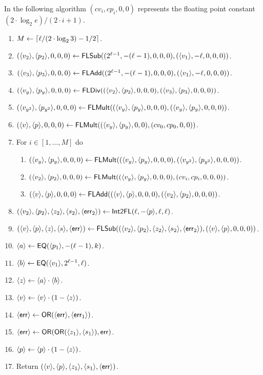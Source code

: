 In the following algorithm $(cv_i,cp_i,0,0)$ represents the floating point
constant $(2 \cdot \log_2 e)/(2 \cdot i+1)$.
\begin{enumerate}
\item $M \leftarrow {\lceil  \ell/(2 \cdot \log_2 3)-1/2 \rceil}$.
\item $(\langle v_2 \rangle,\langle p_2 \rangle,0,0,0) \leftarrow \mathsf{FLSub}((2^{\ell-1},-(\ell-1),0,0,0),(\langle v_1 \rangle,-\ell,0,0,0))$.
\item $(\langle v_3 \rangle,\langle p_3 \rangle,0,0,0) \leftarrow \mathsf{FLAdd}((2^{\ell-1},-(\ell-1),0,0,0),(\langle v_1 \rangle,-\ell,0,0,0))$.
\item $(\langle v_y \rangle,\langle p_y \rangle,0,0,0) \leftarrow \mathsf{FLDiv}((\langle v_2 \rangle,\langle p_2 \rangle,0,0,0),(\langle v_3 \rangle,\langle p_3 \rangle,0,0,0))$.
\item $(\langle v_{y^2} \rangle,\langle p_{y^2} \rangle,0,0,0) \leftarrow \mathsf{FLMult}((\langle v_y \rangle,\langle p_y \rangle,0,0,0),(\langle v_y \rangle,\langle p_y \rangle,0,0,0))$.
\item $(\langle v \rangle,\langle p \rangle,0,0,0) \leftarrow  \mathsf{FLMult}((\langle v_y \rangle,\langle p_y \rangle,0,0),(cv_0,cp_0,0,0))$.
\item For $i \in[1,\ldots,M]$ do
\begin{enumerate}
  \item $(\langle v_y \rangle,\langle p_y \rangle,0,0,0) \leftarrow \mathsf{FLMult}((\langle v_y \rangle,\langle p_y \rangle,0,0,0),(\langle v_{y^2} \rangle,\langle p_{y^2} \rangle,0,0,0))$.
  \item $(\langle v_2 \rangle,\langle p_2 \rangle,0,0,0) \leftarrow \mathsf{FLMult}((\langle v_y \rangle,\langle p_y \rangle,0,0,0),(cv_i,cp_i,0,0,0))$.
  \item $(\langle v \rangle,\langle p \rangle,0,0,0) \leftarrow \mathsf{FLAdd}((\langle v \rangle,\langle p \rangle,0,0,0),(\langle v_2 \rangle,\langle p_2 \rangle,0,0,0))$.
\end{enumerate}
\item $(\langle v_2 \rangle,\langle p_2 \rangle,\langle z_2 \rangle,\langle s_2 \rangle,\langle \mathsf{err}_2 \rangle) \leftarrow \mathsf{Int2FL}(\ell,-\langle p \rangle,\ell,\ell)$.
\item $(\langle v \rangle,\langle p \rangle,\langle z \rangle,\langle s \rangle,\langle \mathsf{err} \rangle) \leftarrow \mathsf{FLSub}((\langle v_2 \rangle,\langle p_2 \rangle,\langle z_2 \rangle,\langle s_2 \rangle,\langle \mathsf{err}_2 \rangle),(\langle v \rangle,\langle p \rangle,0,0,0))$.
\item $\langle a \rangle \leftarrow \mathsf{EQ}(\langle p_1 \rangle,-(\ell-1),k)$.
\item $\langle b \rangle \leftarrow \mathsf{EQ}(\langle v_1 \rangle,2^{\ell-1},\ell)$.
\item $\langle z \rangle \leftarrow \langle a \rangle \cdot \langle b \rangle$.
\item $\langle v \rangle \leftarrow \langle v \rangle \cdot(1-\langle z \rangle)$.
\item $\langle \mathsf{err} \rangle \leftarrow \mathsf{OR}(\langle \mathsf{err} \rangle,\langle \mathsf{err}_1 \rangle)$.
\item $\langle \mathsf{err} \rangle \leftarrow \mathsf{OR}(\mathsf{OR}(\langle z_1 \rangle,\langle s_1 \rangle),\mathsf{err})$.
\item $\langle p \rangle \leftarrow \langle p \rangle \cdot(1-\langle z \rangle)$.
\item Return $(\langle v \rangle,\langle p \rangle,\langle z_1 \rangle,\langle s_1 \rangle,\langle \mathsf{err} \rangle)$.
\end{enumerate}


